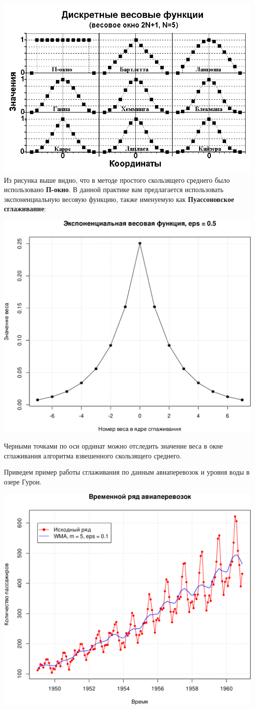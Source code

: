 \documentclass[
]{article}
\begin{document}
\includegraphics{Weight_funcs.png} Из рисунка выше видно, что в методе
простого скользящего среднего было использовано \textbf{П-окно}. В
данной практике вам предлагается использовать экспоненциальную весовую
функцию, также именуемую как \textbf{Пуассоновское сглаживание}:

\begin{center}\includegraphics[width=0.6\linewidth]{Prac6_files/figure-latex/unnamed-chunk-8-1} \end{center}

Черными точками по оси ординат можно отследить значение веса в окне
сглаживания алгоритма взвешенного скользящего среднего.

Приведем пример работы сглаживания по данным авиаперевозок и уровня воды
в озере Гурон.

\begin{center}\includegraphics[width=0.6\linewidth]{Prac6_files/figure-latex/unnamed-chunk-9-1} \end{center}
\end{document}
